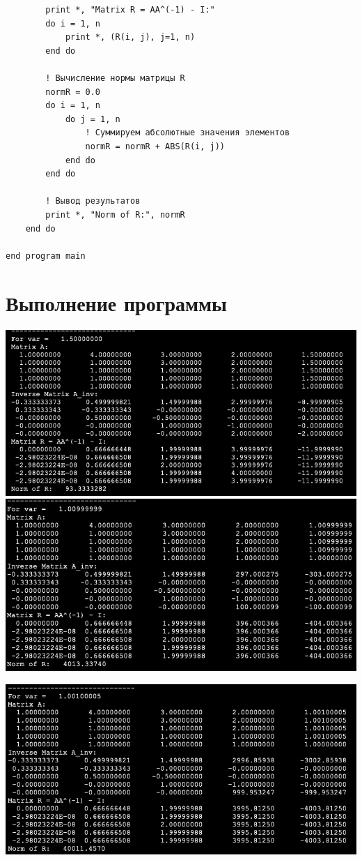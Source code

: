 \documentclass[a4paper,14pt]{article}
\begin{document}
\begin{lstlisting}
        print *, "Matrix R = AA^(-1) - I:"
        do i = 1, n
            print *, (R(i, j), j=1, n)
        end do
        
        ! Вычисление нормы матрицы R
        normR = 0.0
        do i = 1, n
            do j = 1, n
                ! Суммируем абсолютные значения элементов
                normR = normR + ABS(R(i, j))
            end do
        end do
        
        ! Вывод результатов
        print *, "Norm of R:", normR
    end do
    
end program main

\end{lstlisting}

\section{Выполнение программы}

\includegraphics[width=170mm]{var_1_5.png}\\

\includegraphics[width=170mm]{var_1_0.png}

\includegraphics[width=170mm]{var_1_001.png}\\
\end{document}
